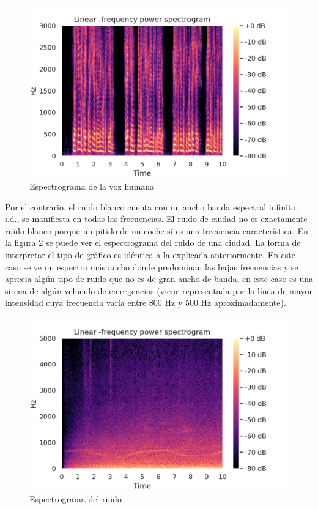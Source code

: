 \begin{figure}[ht!]
	\centering
	\includegraphics[width=0.9\columnwidth]{figures/audio_book_spectrogram.png}
	\caption{Espectrograma de la voz humana}
	\label{fig: voice_spectral}
\end{figure}

Por el contrario, el ruido blanco cuenta con un ancho banda espectral infinito, i.d., se manifiesta en todas las frecuencias. El ruido de ciudad no es exactamente ruido blanco porque un pitido de un coche sí es una frecuencia característica. En la figura \ref{fig: noise_spectral} se puede ver el espectrograma del ruido de una ciudad. La forma de interpretar el tipo de gráfico es idéntica a la explicada anteriormente. En este caso se ve un espectro más ancho donde predominan las bajas frecuencias y se aprecia algún tipo de ruido que no es de gran ancho de banda, en este caso es una sirena de algún vehículo de emergencias (viene representada por la línea de mayor intensidad cuya frecuencia varía entre 800 Hz y 500 Hz aproximadamente).

\begin{figure}[t!]
	\centering
	\includegraphics[width=0.9\columnwidth]{figures/noise_spectrogram.png}
	\caption{Espectrograma del ruido}
	\label{fig: noise_spectral}
\end{figure}

